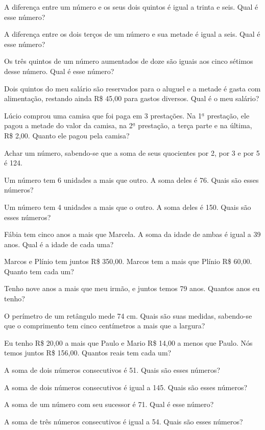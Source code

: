 				\item A diferença entre um número e os seus dois quintos é igual a trinta e seis. Qual é esse número?
				\item A diferença entre os dois terços de um número e sua metade é igual a seis. Qual é esse número?
				\item Os três quintos de um número aumentados de doze são iguais aos cinco sétimos desse número. Qual é esse número?
				\item Dois quintos do meu salário são reservados para o aluguel e a metade é gasta com alimentação, restando ainda R\$ 45,00 para gastos diversos. Qual é o meu salário?
				\item Lúcio comprou uma camisa que foi paga em 3 prestações. Na 1$^{\underline{a}}$ prestação, ele pagou a metade do valor da camisa, na 2$^{\underline{a}}$ prestação, a terça parte e na última, R\$ 2,00. Quanto ele pagou pela camisa?
				\item Achar um número, sabendo-se que a soma de seus quocientes por 2, por 3 e por 5 é 124.
				\item Um número tem 6 unidades a mais que outro. A soma deles é 76. Quais são esses números?
				\item Um número tem 4 unidades a mais que o outro. A soma deles é 150. Quais são esses números?
				\item Fábia tem cinco anos a mais que Marcela. A soma da idade de ambas é igual a 39 anos. Qual é a idade de cada uma?
				\item Marcos e Plínio tem juntos R\$ 350,00. Marcos tem a mais que Plínio R\$ 60,00. Quanto tem cada um?
				\item Tenho nove anos a mais que meu irmão, e juntos temos 79 anos. Quantos anos eu tenho?
				\item O perímetro de um retângulo mede 74 cm. Quais são suas medidas, sabendo-se que o comprimento tem cinco centímetros a mais que a largura?
				\item Eu tenho R\$ 20,00 a mais que Paulo e Mario R\$ 14,00 a menos que Paulo. Nós temos juntos R\$ 156,00. Quantos reais tem cada um?
				\item A soma de dois números consecutivos é 51. Quais são esses números?
				\item A soma de dois números consecutivos é igual a 145. Quais são esses números?
				\item A soma de um número com seu sucessor é 71. Qual é esse número?
				\item A soma de três números consecutivos é igual a 54. Quais são esses números?
